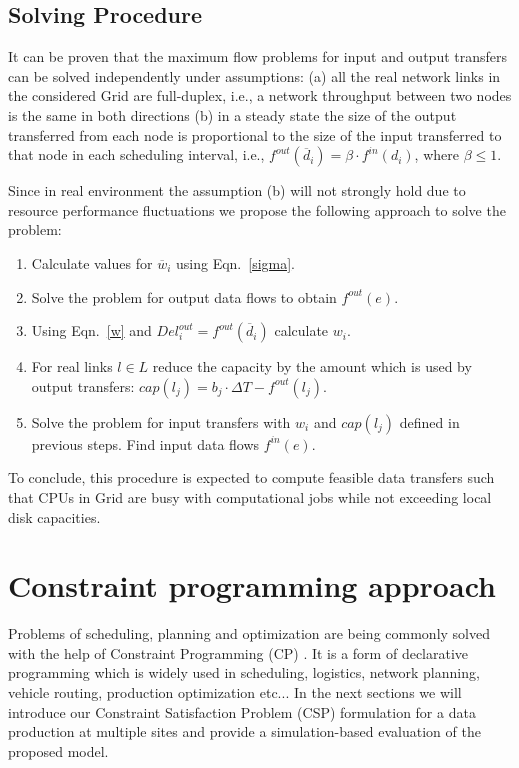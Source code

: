 \documentclass[english]{ddny}
\begin{document}
\subsection{Solving Procedure}
\label{solve}
It can be proven that the maximum flow problems for input and output transfers
can be solved independently under assumptions: (a) all the real network links
in the considered Grid are full-duplex, i.e., a network throughput between two
nodes is the same in both directions (b) in a steady state the size of the
output transferred from each node is proportional to the size of the input
transferred to that node in each scheduling interval, i.e.,
$f^{out}(\overline{d}_{i})= \beta \cdot f^{in}(d_{i})$, where $\beta \leq 1$.

Since in real environment the assumption (b) will not strongly hold due to
resource performance fluctuations we propose the following approach to
solve the problem:
%
\begin{enumerate}
\item Calculate values for $\overline{w}_{i}$ using Eqn.~\ref{sigma}.
\item Solve the problem for output data flows to obtain $f^{out}(e)$.
\item Using Eqn.~\ref{w} and $Del_{i}^{out} = f^{out}(\overline{d}_{i})$ calculate $w_{i}$.
\item For real links $l \in L$ reduce the capacity by the amount which is used by output transfers: $cap(l_{j}) = b_{j} \cdot \Delta T - f^{out}(l_{j})$.
\item Solve the problem for input transfers with $w_{i}$ and $cap(l_{j})$ defined in previous steps. Find input data flows $f^{in}(e)$.
\end{enumerate}
%
To conclude, this procedure is expected to compute feasible data transfers 
such that CPUs in Grid are busy with computational jobs while not exceeding 
local disk capacities.

\section{Constraint programming approach}
\label{CP_approach}
Problems of scheduling, planning and optimization are being commonly solved with the help of Constraint Programming (CP) \cite{CP}. It is a form of declarative programming which is widely used in scheduling, logistics, network planning, vehicle routing, production optimization etc... In the next sections we will introduce our Constraint Satisfaction Problem (CSP) formulation for a data production at multiple sites and provide a simulation-based evaluation of the proposed model.
\end{document}

